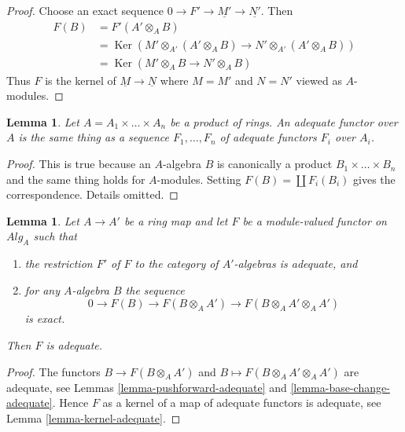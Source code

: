 \documentclass{stacks-project}
\theoremstyle{plain}
\newtheorem{lemma}[subsection]{Lemma}
\theoremstyle{definition}
\theoremstyle{remark}
\numberwithin{equation}{subsection}
\def\Ker{\mathop{\mathrm{Ker}}}
\begin{document}
\begin{proof}
Choose an exact sequence $0 \to F' \to \underline{M'} \to \underline{N'}$.
Then
\begin{align*}
F(B) & = F'(A' \otimes_A B) \\
& = \Ker(M' \otimes_{A'} (
A' \otimes_A B) \to N' \otimes_{A'} (A' \otimes_A B)) \\
& = \Ker(M' \otimes_A B \to N' \otimes_A B)
\end{align*}
Thus $F$ is the kernel of
$\underline{M} \to \underline{N}$
where $M = M'$ and $N = N'$ viewed as $A$-modules.
\end{proof}

\begin{lemma}
\label{lemma-adequate-product}
Let $A = A_1 \times \ldots \times A_n$ be a product of rings.
An adequate functor over $A$ is the same thing as a sequence
$F_1, \ldots, F_n$ of adequate functors $F_i$ over $A_i$.
\end{lemma}

\begin{proof}
This is true because an $A$-algebra $B$ is canonically a product
$B_1 \times \ldots \times B_n$ and the same thing holds for $A$-modules.
Setting $F(B) = \coprod F_i(B_i)$ gives the correspondence.
Details omitted.
\end{proof}

\begin{lemma}
\label{lemma-adequate-descent}
Let $A \to A'$ be a ring map and let $F$ be a module-valued functor on
$\textit{Alg}_A$ such that
\begin{enumerate}
\item the restriction $F'$ of $F$ to the category of $A'$-algebras is
adequate, and
\item for any $A$-algebra $B$ the sequence
$$
0 \to F(B) \to F(B \otimes_A A') \to F(B \otimes_A A' \otimes_A A')
$$
is exact.
\end{enumerate}
Then $F$ is adequate.
\end{lemma}

\begin{proof}
The functors $B \to F(B \otimes_A A')$ and
$B \mapsto F(B \otimes_A A' \otimes_A A')$ are adequate, see
Lemmas \ref{lemma-pushforward-adequate} and
\ref{lemma-base-change-adequate}.
Hence $F$ as a kernel of a map of adequate functors is adequate, see
Lemma \ref{lemma-kernel-adequate}.
\end{proof}
\end{document}
